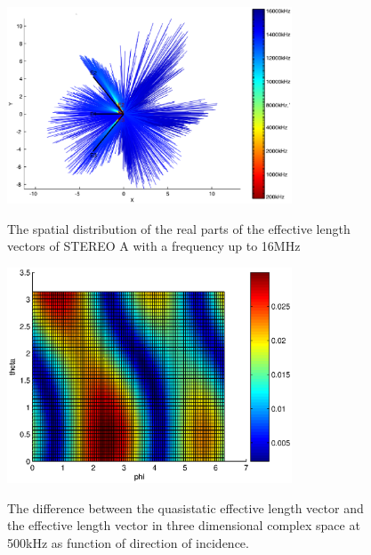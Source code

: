 \documentclass[galley,ras]{agu2001}
\begin{document}
\begin{article}
\begin{figure}
\noindent \includegraphics[width=20pc]{HeffVerteilungD2-ZView_caps.eps} \\
\caption{The spatial distribution of the real parts of the effective length vectors of STEREO A with a frequency up to 16MHz}\label{fig_heff_dist_D2_A_Z_View_caps}
\end{figure}

\begin{figure}
\noindent \includegraphics[width=20pc]{heff_length_variation500kHz_6d.eps} \\
\caption{The difference between the quasistatic effective length vector and the effective length vector in three dimensional complex space at 500kHz as function of direction of incidence.}\label{fig_heff_dist_6d_500kHz_caps}
\end{figure}


\end{article}
\end{document}
